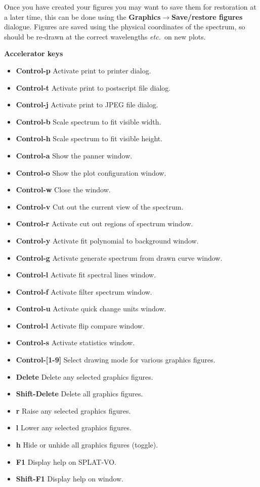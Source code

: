 \documentclass[twoside,11pt]{article}
\newcommand{\latexhtml}[2]{#1}
\renewcommand{\_}{\texttt{\symbol{95}}}
\newcommand{\SPLAT}{\textsf{SPLAT-VO}}
\newcommand{\submenuitem}[2]{\latexhtml{\textbf{#1$\rightarrow$#2}}{\textbf{#1->#2}}}
\newcommand{\labelitem}[1]{\textbf{#1}}
\newcommand{\etc}{\textit{etc.}}
\newcommand{\subheading}[1]{\textbf{\large{#1}}}
\begin{document}
Once you have created your figures you may want to save them for restoration
at a later time, this can be done using the
\submenuitem{Graphics}{Save/restore figures} dialogue. Figures are saved using
the physical coordinates of the spectrum, so should be re-drawn at the correct
wavelengths \etc\ on new plots.

\subheading{Accelerator keys}

\begin{itemize}
\item \labelitem{Control-p} Activate print to printer dialog.
\item \labelitem{Control-t} Activate print to postscript file dialog.
\item \labelitem{Control-j} Activate print to JPEG file dialog.
\item \labelitem{Control-b} Scale spectrum to fit visible width.
\item \labelitem{Control-h} Scale spectrum to fit visible height.
\item \labelitem{Control-a} Show the panner window.
\item \labelitem{Control-o} Show the plot configuration window.
\item \labelitem{Control-w} Close the window.
\item \labelitem{Control-v} Cut out the current view of the spectrum.
\item \labelitem{Control-r} Activate cut out regions of spectrum window.
\item \labelitem{Control-y} Activate fit polynomial to background window.
\item \labelitem{Control-g} Activate generate spectrum from drawn curve window.
\item \labelitem{Control-l} Activate fit spectral lines window.
\item \labelitem{Control-f} Activate filter spectrum window.
\item \labelitem{Control-u} Activate quick change units window.
\item \labelitem{Control-l} Activate flip compare window.
\item \labelitem{Control-s} Activate statistics window.
\item \labelitem{Control-[1-9]} Select drawing mode for various graphics figures.
\item \labelitem{Delete} Delete any selected graphics figures.
\item \labelitem{Shift-Delete} Delete all graphics figures.
\item \labelitem{r} Raise any selected graphics figures.
\item \labelitem{l} Lower any selected graphics figures.
\item \labelitem{h} Hide or unhide all graphics figures (toggle).
\item \labelitem{F1} Display help on \SPLAT.
\item \labelitem{Shift-F1} Display help on window.
\end{itemize}
\end{document}
